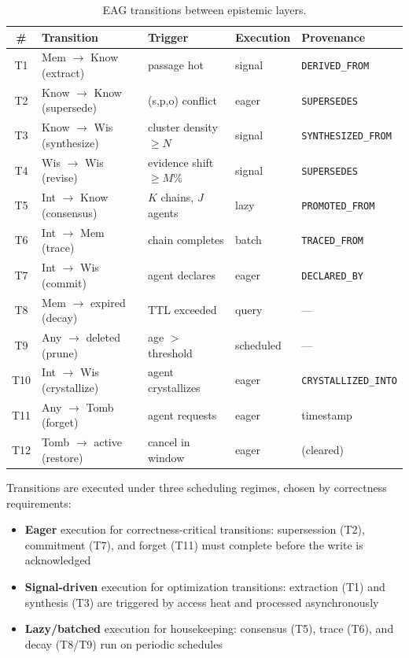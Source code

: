 \documentclass[11pt,letterpaper]{article}
\begin{document}
\begin{table}[H]
\centering
\caption{EAG transitions between epistemic layers.}
\label{tab:transitions}
\begin{tabular}{@{}clllp{3.8cm}@{}}
\toprule
\textbf{\#} & \textbf{Transition} & \textbf{Trigger} & \textbf{Execution} & \textbf{Provenance} \\
\midrule
T1 & Mem $\to$ Know (extract) & passage hot & signal & \texttt{DERIVED\_FROM} \\
T2 & Know $\to$ Know (supersede) & (s,p,o) conflict & eager & \texttt{SUPERSEDES} \\
T3 & Know $\to$ Wis (synthesize) & cluster density $\geq N$ & signal & \texttt{SYNTHESIZED\_FROM} \\
T4 & Wis $\to$ Wis (revise) & evidence shift $\geq M\%$ & signal & \texttt{SUPERSEDES} \\
T5 & Int $\to$ Know (consensus) & $K$ chains, $J$ agents & lazy & \texttt{PROMOTED\_FROM} \\
T6 & Int $\to$ Mem (trace) & chain completes & batch & \texttt{TRACED\_FROM} \\
T7 & Int $\to$ Wis (commit) & agent declares & eager & \texttt{DECLARED\_BY} \\
T8 & Mem $\to$ expired (decay) & TTL exceeded & query & --- \\
T9 & Any $\to$ deleted (prune) & age $>$ threshold & scheduled & --- \\
T10 & Int $\to$ Wis (crystallize) & agent crystallizes & eager & \texttt{CRYSTALLIZED\_INTO} \\
T11 & Any $\to$ Tomb (forget) & agent requests & eager & timestamp \\
T12 & Tomb $\to$ active (restore) & cancel in window & eager & (cleared) \\
\bottomrule
\end{tabular}
\end{table}

Transitions are executed under three scheduling regimes, chosen by correctness requirements:
\begin{itemize}[noitemsep]
    \item \textbf{Eager} execution for correctness-critical transitions: supersession (T2), commitment (T7), and forget (T11) must complete before the write is acknowledged
    \item \textbf{Signal-driven} execution for optimization transitions: extraction (T1) and synthesis (T3) are triggered by access heat and processed asynchronously
    \item \textbf{Lazy/batched} execution for housekeeping: consensus (T5), trace (T6), and decay (T8/T9) run on periodic schedules
\end{itemize}
\end{document}
